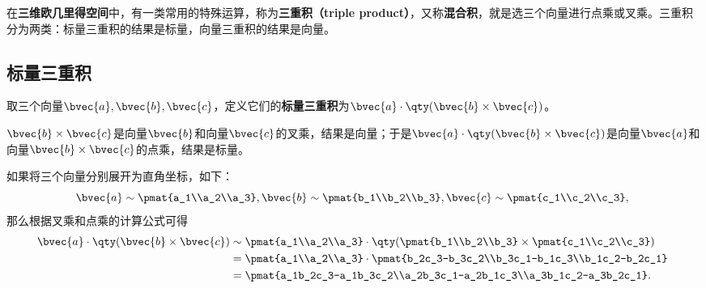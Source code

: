 




在\textbf{三维欧几里得空间}中，有一类常用的特殊运算，称为\textbf{三重积（triple product）}，又称\textbf{混合积}，就是选三个向量进行点乘或叉乘。三重积分为两类：标量三重积的结果是标量，向量三重积的结果是向量。




\subsection{标量三重积}


取三个向量$\bvec{a}, \bvec{b}, \bvec{c}$，定义它们的\textbf{标量三重积}为$\bvec{a}\cdot\qty(\bvec{b}\times\bvec{c})$。

$\bvec{b}\times\bvec{c}$是向量$\bvec{b}$和向量$\bvec{c}$的叉乘，结果是向量；于是$\bvec{a}\cdot\qty(\bvec{b}\times\bvec{c})$是向量$\bvec{a}$和向量$\bvec{b}\times\bvec{c}$的点乘，结果是标量。

如果将三个向量分别展开为直角坐标，如下：
\begin{equation}
\bvec{a}\sim\pmat{a_1\\a_2\\a_3}, \bvec{b}\sim\pmat{b_1\\b_2\\b_3}, \bvec{c}\sim\pmat{c_1\\c_2\\c_3}, ~
\end{equation}
那么根据叉乘和点乘的计算公式可得
\begin{equation}
\begin{aligned}
\bvec{a}\cdot\qty(\bvec{b}\times\bvec{c}) \sim{}& \pmat{a_1\\a_2\\a_3}\cdot\qty(\pmat{b_1\\b_2\\b_3}\times \pmat{c_1\\c_2\\c_3})\\
={}& \pmat{a_1\\a_2\\a_3}\cdot\pmat{b_2c_3-b_3c_2\\b_3c_1-b_1c_3\\b_1c_2-b_2c_1}\\
={}& \pmat{a_1b_2c_3-a_1b_3c_2\\a_2b_3c_1-a_2b_1c_3\\a_3b_1c_2-a_3b_2c_1}. 
\end{aligned}~
\end{equation}

